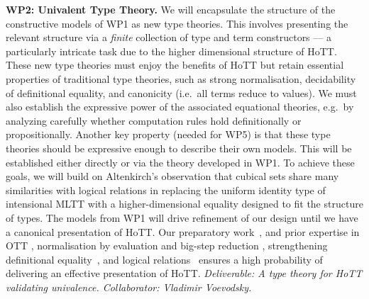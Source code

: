 \documentclass[a4paper,11pt]{article}
\begin{document}

{\bf WP2: Univalent Type Theory.} We will encapsulate
the structure of the constructive models of WP1 as new type
theories. This involves presenting the relevant structure via 
a {\em finite} collection of type and term constructors --- a 
particularly intricate task due to the  higher dimensional
structure of HoTT. These new type theories must enjoy the benefits of
HoTT but retain essential properties of traditional type theories, such as strong normalisation, decidability of
definitional equality, and canonicity ({i.e.}~all terms reduce to
values). We must also establish the expressive
power of the associated equational theories, {e.g.}~by analyzing
carefully whether computation rules hold definitionally or
propositionally. Another key property (needed for WP5) 
is that these type theories should be expressive enough to describe their own models. This will be established either 
directly or via the theory developed in WP1.
To achieve these goals, 
we will build on Altenkirch's observation \cite{txa-ihp14} that cubical sets share
many similarities with logical relations in replacing the uniform
identity type of intensional MLTT with a higher-dimensional equality
designed to fit the structure of types. The models from WP1 will drive
refinement of our design until we have a canonical presentation of
HoTT. Our preparatory work~\cite{txa-ihp14}, and prior expertise in OTT
\cite{alti:ott-conf}, normalisation by evaluation and big-step
reduction \cite{alti:lics96}, %
strengthening definitional
equality~\cite{Allais:2013:NEN:2502409.2502411}, and logical
relations~\cite{neil2014relParamDep} ensures a high probability of
delivering an effective presentation of HoTT.  {\em Deliverable: A
  type theory for HoTT validating univalence.
Collaborator: Vladimir Voevodsky.
}
\end{document}
